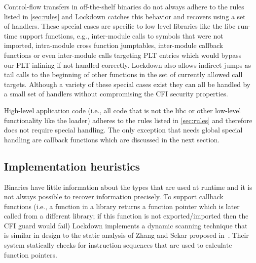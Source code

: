 \documentclass{acm_proc_article-sp}
\begin{document}
Control-flow transfers in off-the-shelf binaries do not always adhere to the
rules listed in \autoref{sec:rules} and Lockdown catches this behavior and
recovers using a set of handlers. These special cases are specific to low level
libraries like the libc run-time support functions, e.g., inter-module calls to
symbols that were not imported, intra-module cross function jumptables,
inter-module callback functions or even inter-module calls targeting PLT entries
which would bypass our PLT inlining if not handled correctly. Lockdown also
allows indirect jumps as tail calls to the beginning of other functions in the
set of currently allowed call targets. Although a variety of these special cases
exist they can all be handled by a small set of handlers without compromising
the CFI security properties.

High-level application code (i.e., all code that is not the libc or other
low-level functionality like the loader) adheres to the rules listed in
\autoref{sec:rules} and therefore does not require special handling. The only
exception that needs global special handling are callback functions which are
discussed in the next section.

\subsection{Implementation heuristics}


Binaries have little information about the types that are used at runtime and it
is not always possible to recover information precisely. To support callback
functions (i.e., a function in a library returns a function pointer which is
later called from a different library; if this function is not exported/imported
then the CFI guard would fail) Lockdown implements a dynamic scanning technique
that is similar in design to the static analysis of Zhang and Sekar proposed
in~\cite{zhang13security}. Their system statically checks for instruction
sequences that are used to calculate function pointers. 
\end{document}
